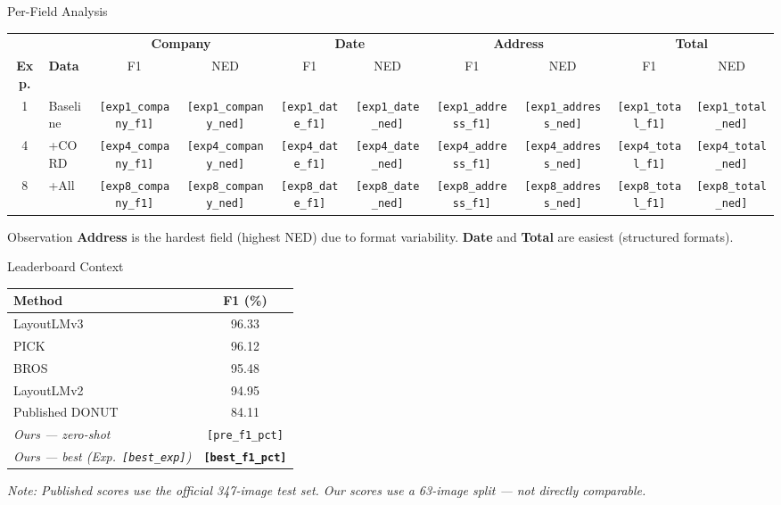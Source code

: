 \documentclass[aspectratio=169,11pt]{beamer}
\newcommand{\VAR}[1]{\texttt{[#1]}\xspace}
\newcommand{\hlnum}[1]{\textcolor{AccentTeal}{\textbf{#1}}}
\begin{document}
\begin{frame}{Per-Field Analysis}
  \centering
  {\footnotesize
  \begin{tabular}{@{}clcccccccc@{}}
    \toprule
    & &
    \multicolumn{2}{c}{\textbf{Company}} &
    \multicolumn{2}{c}{\textbf{Date}} &
    \multicolumn{2}{c}{\textbf{Address}} &
    \multicolumn{2}{c}{\textbf{Total}} \\
    \cmidrule(lr){3-4}\cmidrule(lr){5-6}\cmidrule(lr){7-8}\cmidrule(lr){9-10}
    \textbf{Exp.} & \textbf{Data} & F1 & NED & F1 & NED & F1 & NED & F1 & NED \\
    \midrule
    1 & Baseline & \VAR{exp1_company_f1} & \VAR{exp1_company_ned} & \VAR{exp1_date_f1} & \VAR{exp1_date_ned} & \VAR{exp1_address_f1} & \VAR{exp1_address_ned} & \VAR{exp1_total_f1} & \VAR{exp1_total_ned} \\
    4 & +CORD    & \VAR{exp4_company_f1} & \VAR{exp4_company_ned} & \VAR{exp4_date_f1} & \VAR{exp4_date_ned} & \VAR{exp4_address_f1} & \VAR{exp4_address_ned} & \VAR{exp4_total_f1} & \VAR{exp4_total_ned} \\
    8 & +All     & \VAR{exp8_company_f1} & \VAR{exp8_company_ned} & \VAR{exp8_date_f1} & \VAR{exp8_date_ned} & \VAR{exp8_address_f1} & \VAR{exp8_address_ned} & \VAR{exp8_total_f1} & \VAR{exp8_total_ned} \\
    \bottomrule
  \end{tabular}
  }

  \vspace{0.4cm}
  \begin{alertblock}{Observation}
    \textbf{Address} is the hardest field (highest NED) due to
    format variability. \textbf{Date} and \textbf{Total} are
    easiest (structured formats).
  \end{alertblock}
\end{frame}

\begin{frame}{Leaderboard Context}
  \centering
  \begin{tabular}{@{}lc@{}}
    \toprule
    \textbf{Method} & \textbf{F1 (\%)} \\
    \midrule
    LayoutLMv3     & 96.33 \\
    PICK           & 96.12 \\
    BROS           & 95.48 \\
    LayoutLMv2     & 94.95 \\
    Published DONUT & 84.11 \\
    \midrule
    \textit{Ours --- zero-shot}         & \VAR{pre_f1_pct} \\
    \textit{Ours --- best (Exp.~\VAR{best_exp})} & \hlnum{\VAR{best_f1_pct}} \\
    \bottomrule
  \end{tabular}

  \vspace{0.4cm}
  {\small\textit{Note: Published scores use the official 347-image test set.
  Our scores use a 63-image split --- not directly comparable.}}
\end{frame}
\end{document}
